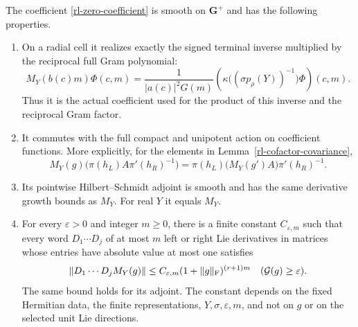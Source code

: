 \begin{theorem}\label{rl-regular-inverse}
The coefficient \eqref{rl-zero-coefficient} is smooth
on $\mathbf G^+$ and has the following properties.

\begin{enumerate}
\item On a radial cell it realizes exactly the signed
terminal inverse multiplied by the reciprocal full
Gram polynomial:
\[
 M_Y(b(c)m)\Phi(c,m)
    =\frac1{|a(c)|^2G(m)}
       \left(\kappa\bigl(
            (\sigma p_\rho(Y))^{-1}\bigr)\Phi\right)(c,m).
\]
Thus it is the actual coefficient used for the product
of this inverse and the reciprocal Gram factor.
\item It commutes with the full compact and unipotent
action on coefficient functions.  More explicitly,
for the elements in Lemma~\ref{rl-cofactor-covariance},
\[
 M_Y(g)\bigl(\pi(h_L)A\pi'(h_R)^{-1}\bigr)
    =\pi(h_L)\bigl(M_Y(g')A\bigr)\pi'(h_R)^{-1}.
\]
\item Its pointwise Hilbert--Schmidt adjoint is smooth
and has the same derivative growth bounds as $M_Y$.
For real $Y$ it equals $M_Y$.
\item For every $\varepsilon>0$ and integer $m\geq0$,
there is a finite constant $C_{\varepsilon,m}$ such that
every word $D_1\cdots D_j$ of at most $m$ left or right
Lie derivatives in matrices whose entries have absolute
value at most one satisfies
\begin{equation}\label{rl-growth}
 \|D_1\cdots D_j M_Y(g)\|
       \leq C_{\varepsilon,m}
                      (1+\|g\|_{\rm F})^{(r+1)m}
         \quad(\mathcal G(g)\geq\varepsilon).
\end{equation}
The same bound holds for its adjoint.
The constant depends on the fixed Hermitian data,
the finite representations, $Y,\sigma,\varepsilon,m$,
and not on $g$ or on the selected unit Lie directions.
\end{enumerate}
\end{theorem}

